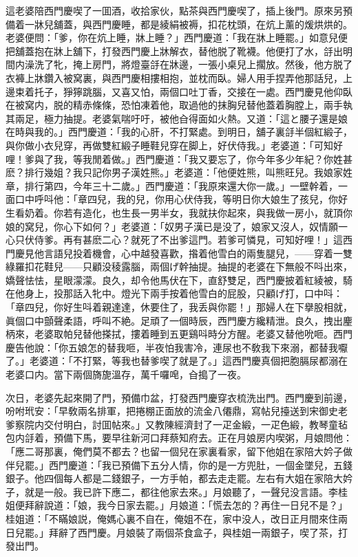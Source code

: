 這老婆陪西門慶喫了一囬酒，收拾家伙，點茶與西門慶喫了，插上後門。原來另預備着一牀兒舖蓋，與西門慶睡，都是綾絹被褥，扣花枕頭，在炕上薰的煖烘烘的。老婆便問：「爹，你在炕上睡，牀上睡？」西門慶道：「我在牀上睡罷。」如意兒便把舖蓋抱在牀上舖下，打發西門慶上牀解衣，替他脱了靴襪。他便打了水，㧱出明間内澡洗了牝，掩上房門，將燈臺㧱在牀邊，一張小桌兒上擱放。然後，他方脱了衣褲上牀鑽入被窝裏，與西門慶相摟相抱，並枕而臥。婦人用手捏弄他那話兒，上邊束着托子，猙獰跳腦，又喜又怕，兩個口吐丁香，交接在一處。西門慶見他仰臥在被窝内，脱的精赤條條，恐怕凍着他，取過他的抹胸兒替他蓋着胸膛上，兩手執其兩足，極力抽提。老婆氣喘吁吁，被他㒲得面如火熱。又道：「這と腰子還是娘在時與我的。」西門慶道：「我的心肝，不打緊處。到明日，舖子裏㧱半個紅緞子，與你做小衣兒穿，再做雙紅緞子睡鞋兒穿在脚上，好伏侍我。」老婆道：「可知好哩！爹與了我，等我閒着做。」西門慶道：「我又要忘了，你今年多少年紀？你姓甚麽？排行幾姐？我只記你男子漢姓熊。」老婆道：「他便姓熊，叫熊旺兒。我娘家姓章，排行第四，今年三十二歲。」西門慶道：「我原來還大你一歲。」一壁幹着，一面口中呼呌他：「章四兒，我的兒，你用心伏侍我，等明日你大娘生了孩兒，你好生看奶着。你若有造化，也生長一男半女，我就扶你起來，與我做一房小，就頂你娘的窝兒，你心下如何？」老婆道：「奴男子漢已是没了，娘家又沒人，奴情願一心只伏侍爹。再有甚麽二心？就死了不出爹這門。若爹可憐見，可知好哩！」這西門慶見他言語兒投着機會，心中越發喜歡，揝着他雪白的兩隻腿兒，——穿着一雙綠羅扣花鞋兒——只顧没稜露腦，兩個げ幹抽提。抽提的老婆在下無般不呌出來，嬌聲怯怯，星眼濛濛。良久，却令他馬伏在下，直舒雙足，西門慶披着紅綾被，騎在他身上，投那話入牝中。燈光下兩手按着他雪白的屁股，只顧げ打，口中呌：「章四兒，你好生呌着親達達，休要住了，我丢與你罷！」那婦人在下擧股相就，眞個口中顫聲柔語，呼叫不絶。足頑了一個時辰，西門慶方纔精泄。良久，拽出麈柄來，老婆取帕兒替他搽拭，摟着睡到五更鷄呌時分方醒。老婆又替他吮咂。西門慶告他說：「你五娘怎的替我咂，半夜怕我害冷，連尿也不敎我下來溺，都替我嚈了。」老婆道：「不打緊，等我也替爹喫了就是了。」這西門慶真個把胞膈尿都溺在老婆口内。當下兩個旖旎溫存，萬千囉唣，㒲搗了一夜。

次日，老婆先起來開了門，預備巾盆，打發西門慶穿衣梳洗出門。西門慶到前邊，吩咐玳安：「早敎兩名排軍，把捲棚正面放的流金八僊鼎，寫帖兒擡送到宋御史老爹察院内交付明白，討囬帖來。」又教陳經濟封了一疋金緞，一疋色緞，教琴童毡包内㧱着，預備下馬，要早往新河口拜蔡知府去。正在月娘房内喫粥，月娘問他：「應二哥那裏，俺們莫不都去？也留一個兒在家裏看家，留下他姐在家陪大妗子做伴兒罷。」西門慶道：「我已預備下五分人情，你的是一方兜肚，一個金墜兒，五錢銀子。他四個每人都是二錢銀子，一方手帕，都去走走罷。左右有大姐在家陪大妗子，就是一般。我已許下應二，都往他家去來。」月娘聽了，一聲兒没言語。李桂姐便拜辭說道：「娘，我今日家去罷。」月娘道：「慌去怎的？再住一日兒不是？」桂姐道：「不瞞娘説，俺媽心裏不自在，俺姐不在，家中没人，改日正月間來住兩日兒罷。」拜辭了西門慶。月娘裝了兩個茶食盒子，與桂姐一兩銀子，喫了茶，打發出門。

